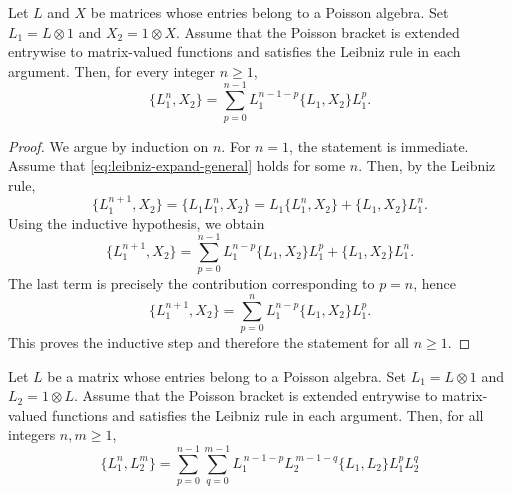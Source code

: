 \begin{proposition}\label{prop:leibniz-expand-general}
    Let $L$ and $X$ be matrices whose entries belong to a Poisson algebra.
    Set $L_1 = L \otimes 1$ and $X_2 = 1 \otimes X$.
    Assume that the Poisson bracket is extended entrywise to matrix-valued functions and satisfies the Leibniz rule in each argument.
    Then, for every integer $n \ge 1$,
    \begin{equation}\label{eq:leibniz-expand-general}
        \{L_1^n, X_2\}
        =
        \sum_{p=0}^{n-1}
        L_1^{n-1-p} \{L_1, X_2\} L_1^p.
    \end{equation}
\end{proposition}

\begin{proof}
    We argue by induction on $n$.
    For $n=1$, the statement is immediate.
    Assume that \eqref{eq:leibniz-expand-general} holds for some $n$. Then, by the Leibniz rule,
    \begin{equation}
        \{L_1^{n+1}, X_2\} = \{L_1 L_1^n, X_2\} = L_1 \{L_1^n, X_2\} + \{L_1, X_2\} L_1^n.
    \end{equation}
    Using the inductive hypothesis, we obtain
    \begin{equation}
        \{L_1^{n+1}, X_2\}
        = \sum_{p=0}^{n-1} L_1^{n-p} \{L_1, X_2\} L_1^p + \{L_1, X_2\} L_1^n.
    \end{equation}
    The last term is precisely the contribution corresponding to $p=n$, hence
    \begin{equation}
        \{L_1^{n+1}, X_2\}
        = \sum_{p=0}^{n} L_1^{n-p} \{L_1, X_2\} L_1^p.
    \end{equation}
    This proves the inductive step and therefore the statement for all $n \ge 1$.
\end{proof}

\begin{corollary}\label{cor:leibniz-expand}
    Let $L$ be a matrix whose entries belong to a Poisson algebra.
    Set $L_1 = L \otimes 1$ and $L_2 = 1 \otimes L$.
    Assume that the Poisson bracket is extended entrywise to matrix-valued functions and satisfies the Leibniz rule in each argument.
    Then, for all integers $n,m \ge 1$,
    \begin{equation}\label{eq:leibniz-expand}
        \{L_1^n,L_2^m\}
        =
        \sum_{p=0}^{n-1}\sum_{q=0}^{m-1}
        L_1^{\,n-1-p}L_2^{\,m-1-q}
        \{L_1,L_2\}
        L_1^pL_2^q
    \end{equation}
\end{corollary}


